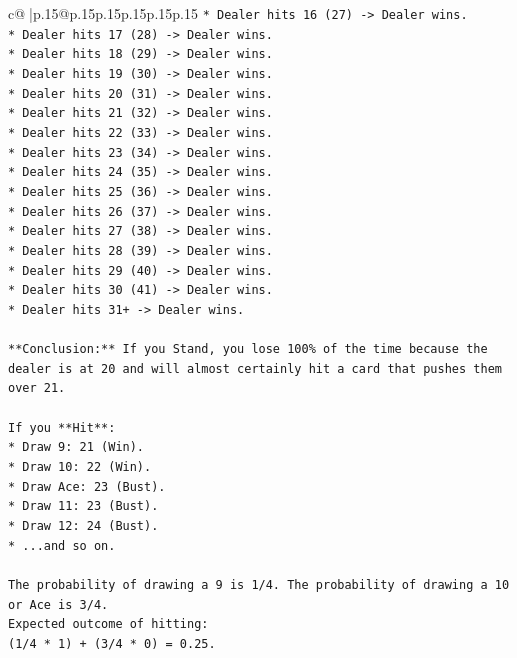 \documentclass{article}
\begin{document}
{\begin{supertabular}{c@{$\;$}|p{.15\linewidth}@{}p{.15\linewidth}p{.15\linewidth}p{.15\linewidth}p{.15\linewidth}p{.15\linewidth}}
{{{\texttt{*   Dealer hits 16 (27) {-}> Dealer wins.} \\
\texttt{*   Dealer hits 17 (28) {-}> Dealer wins.} \\
\texttt{*   Dealer hits 18 (29) {-}> Dealer wins.} \\
\texttt{*   Dealer hits 19 (30) {-}> Dealer wins.} \\
\texttt{*   Dealer hits 20 (31) {-}> Dealer wins.} \\
\texttt{*   Dealer hits 21 (32) {-}> Dealer wins.} \\
\texttt{*   Dealer hits 22 (33) {-}> Dealer wins.} \\
\texttt{*   Dealer hits 23 (34) {-}> Dealer wins.} \\
\texttt{*   Dealer hits 24 (35) {-}> Dealer wins.} \\
\texttt{*   Dealer hits 25 (36) {-}> Dealer wins.} \\
\texttt{*   Dealer hits 26 (37) {-}> Dealer wins.} \\
\texttt{*   Dealer hits 27 (38) {-}> Dealer wins.} \\
\texttt{*   Dealer hits 28 (39) {-}> Dealer wins.} \\
\texttt{*   Dealer hits 29 (40) {-}> Dealer wins.} \\
\texttt{*   Dealer hits 30 (41) {-}> Dealer wins.} \\
\texttt{*   Dealer hits 31+ {-}> Dealer wins.} \\
\\ 
\texttt{**Conclusion:** If you Stand, you lose 100\% of the time because the dealer is at 20 and will almost certainly hit a card that pushes them over 21.} \\
\\ 
\texttt{If you **Hit**:} \\
\texttt{*   Draw 9: 21 (Win).} \\
\texttt{*   Draw 10: 22 (Win).} \\
\texttt{*   Draw Ace: 23 (Bust).} \\
\texttt{*   Draw 11: 23 (Bust).} \\
\texttt{*   Draw 12: 24 (Bust).} \\
\texttt{*   ...and so on.} \\
\\ 
\texttt{The probability of drawing a 9 is 1/4. The probability of drawing a 10 or Ace is 3/4.} \\
\texttt{Expected outcome of hitting:} \\
\texttt{(1/4 * 1) + (3/4 * 0) = 0.25.} \\
}}}
\end{supertabular}}
\end{document}
